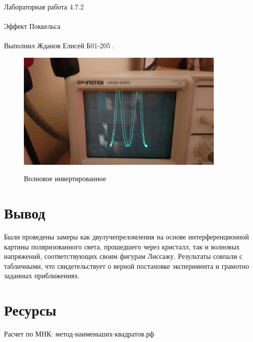 \documentclass{astroedu-lab}
\begin{document}
\begin{problem}{\huge Лабораторная работа 4.7.2\\\\Эффект Поккельса\\\\Выполнил Жданов Елисей Б01-205}
\newpage
.
\begin{figure}[!h]
	\centering
	\includegraphics[width=0.9\textwidth]{YST5G-3Lncg.jpg}
	\label{fig:boiler}
	\caption{Волновое инвертированное}
\end{figure}

\newpage

\section{Вывод}

Были проведены замеры как двулучепреломления на основе интерференционной картины поляризованного света, прошедшего через кристалл, так и волновых напряжений, соответствующих своим фигурам Лиссажу. Результаты совпали с табличными, что свидетельствует о верной постановке эксперимента и грамотно заданных приближениях.

\section{Ресурсы}

Расчет по МНК: метод-наименьших-квадратов.рф


\end{problem}
\end{document}
